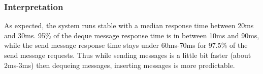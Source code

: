 \documentclass[milestone1.tex]{subfiles}
\begin{document}
\subsubsection{Interpretation}
As expected, the system runs stable with a median response time between 20ms and 30ms. 95\% of the deque message response time is in between 10ms and 90ms, while the send message response time stays under 60ms-70ms for 97.5\% of the send message requests. Thus while sending messages is a little bit faster (about 2ms-3ms) then dequeing messages, inserting messages is more predictable.
\end{document}
